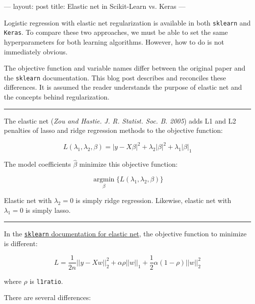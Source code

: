 ---
layout: post
title: Elastic net in Scikit-Learn vs. Keras
---

\usepackage{amsmath}
\DeclareMathOperator*{\argmax}{argmax} %

Logistic regression with elastic net regularization is available in both \texttt{sklearn} and \texttt{Keras}. To compare these two approaches, we must be able to set the same hyperparameters for both learning algorithms. However, how to do is not immediately obvious.

The objective function and variable names differ between the original paper and the \texttt{sklearn} documentation. This blog post describes and reconciles these differences. It is assumed the reader understands the purpose of elastic net and the concepts behind regularization.

\par\noindent\rule{\textwidth}{1pt}

The elastic net (\emph{Zou and Hastie. J. R. Statist. Soc. B. 2005}) adds L1 and L2 penalties of lasso and ridge regression methods to the objective function:

$$
L(\lambda_{1}, \lambda_{2}, \beta) = 
\vert y - X\beta \vert^{2}
+ \lambda_{2} \vert \beta \vert^{2}
+ \lambda_{1} \vert \beta \vert_{1}
$$

The model coefficients $\hat{\beta}$ minimize this objective function:

$$
\underset{\beta}{\operatorname{argmin}} \{L(\lambda_{1}, \lambda_{2}, \beta)\}
$$


Elastic net with $\lambda_{2}=0$ is simply ridge regression. Likewise, elastic net with $\lambda_{1}=0$ is simply lasso.

\par\noindent\rule{\textwidth}{1pt}

In the \href{https://scikit-learn.org/stable/modules/generated/sklearn.linear_model.ElasticNet.html}{\texttt{sklearn} documentation for elastic net}, the objective function to minimize is different:

$$
L = 
\frac{1}{2n} ||y - Xw||^{2}_{2}
+ \alpha \rho ||w||_1
+ \frac{1}{2} \alpha (1 - \rho) ||w||^{2}_{2}
$$

where $\rho$ is \texttt{l1\textunderscore ratio}.

There are several differences:

